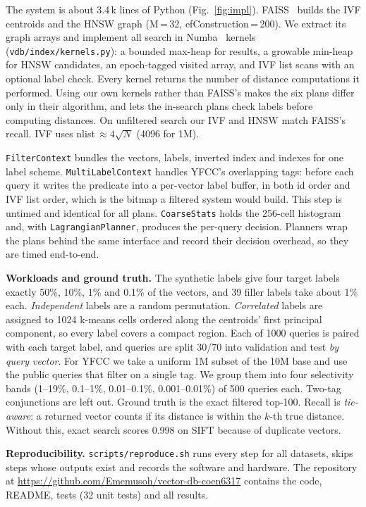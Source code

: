 \documentclass[sigconf,nonacm]{acmart}
\newcommand{\repo}{\url{https://github.com/Ememusoh/vector-db-coen6317}}
\begin{document}
The system is about 3.4\,k lines of Python (Fig.~\ref{fig:impl}). FAISS~\cite{douze2024faiss} builds the IVF centroids and the HNSW graph (M\,=\,32, efConstruction\,=\,200). We extract its graph arrays and implement all search in Numba~\cite{lam2015numba} kernels (\texttt{vdb/index/kernels.py}): a bounded max-heap for results, a growable min-heap for HNSW candidates, an epoch-tagged visited array, and IVF list scans with an optional label check. Every kernel returns the number of distance computations it performed. Using our own kernels rather than FAISS's makes the six plans differ only in their algorithm, and lets the in-search plans check labels before computing distances. On unfiltered search our IVF and HNSW match FAISS's recall. IVF uses nlist\,$\approx4\sqrt{N}$ (4096 for 1M).

\texttt{FilterContext} bundles the vectors, labels, inverted index and indexes for one label scheme. \texttt{MultiLabelContext} handles YFCC's overlapping tags: before each query it writes the predicate into a per-vector label buffer, in both id order and IVF list order, which is the bitmap a filtered system would build. This step is untimed and identical for all plans. \texttt{CoarseStats} holds the 256-cell histogram and, with \texttt{LagrangianPlanner}, produces the per-query decision. Planners wrap the plans behind the same interface and record their decision overhead, so they are timed end-to-end.

\textbf{Workloads and ground truth.} The synthetic labels give four target labels exactly 50\%, 10\%, 1\% and 0.1\% of the vectors, and 39 filler labels take about 1\% each. \emph{Independent} labels are a random permutation. \emph{Correlated} labels are assigned to 1024 k-means cells ordered along the centroids' first principal component, so every label covers a compact region. Each of 1000 queries is paired with each target label, and queries are split 30/70 into validation and test \emph{by query vector}. For YFCC we take a uniform 1M subset of the 10M base and use the public queries that filter on a single tag. We group them into four selectivity bands (1--19\%, 0.1--1\%, 0.01--0.1\%, 0.001--0.01\%) of 500 queries each. Two-tag conjunctions are left out. Ground truth is the exact filtered top-100. Recall is \emph{tie-aware}: a returned vector counts if its distance is within the $k$-th true distance. Without this, exact search scores 0.998 on SIFT because of duplicate vectors.

\textbf{Reproducibility.} \texttt{scripts/reproduce.sh} runs every step for all datasets, skips steps whose outputs exist and records the software and hardware. The repository at \repo{} contains the code, README, tests (32 unit tests) and all results.
\end{document}
